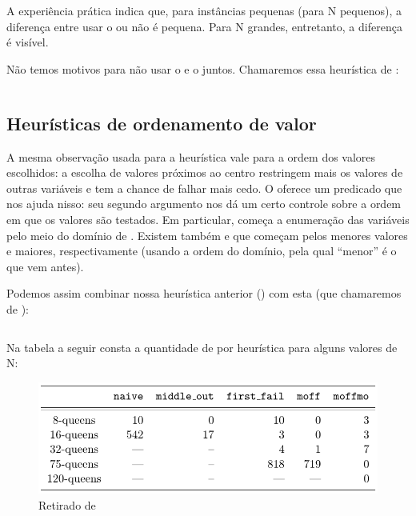 \documentclass{article}
\begin{document}
A experiência prática indica que, para instâncias pequenas (para N pequenos), a diferença entre usar
o  ou não é pequena. Para N grandes, entretanto, a diferença é visível.

Não temos motivos  para não usar o  e o
 juntos. Chamaremos essa heurística de :

\inputminted{prolog}{../Exemplos/Cap11/prog5_queensHeurMoff.ecl}

\subsection{Heurísticas de ordenamento de valor}

A mesma observação usada para a heurística  vale para a ordem dos valores
escolhidos: a escolha de valores próximos ao centro restringem mais os valores de outras variáveis e
tem a chance de falhar mais cedo. O \eclipse oferece um predicado  que nos ajuda
nisso: seu segundo argumento nos dá um certo controle sobre a ordem em que os valores são testados.
Em particular,  começa a enumeração das variáveis pelo meio do domínio
de . Existem também  e  que começam
pelos menores valores e maiores, respectivamente (usando a ordem do domínio, pela qual ``menor'' é o
que vem antes).

Podemos assim combinar nossa heurística anterior () com esta (que chamaremos de
):

\inputminted{prolog}{../Exemplos/Cap11/prog6_queensHeurMoffMo.ecl}

Na tabela a seguir consta a quantidade de  por heurística para alguns
valores de N:

\begin{figure}[h]
  \caption{Retirado de \cite{krzysztof}}\label{fig:psi}
  \centering
  \includegraphics[scale=0.5]{HeuristicsBacktrack.png}
\end{figure}
\end{document}
